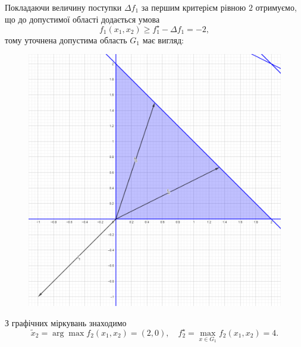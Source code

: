 \begin{solution}
    Покладаючи величину поступки $\Delta f_1$ за першим критерієм рівною $2$ отримуємо, що до допустимої області додається умова \[ f_1(x_1, x_2) \ge f_1^\star - \Delta f_1 = -2, \] тому уточнена допустима область $G_1$ має вигляд:
    \begin{figure}[H]
        \centering
        \includegraphics[width=\textwidth]{successive_concessions_1_2.png}
    \end{figure}

    З графічних міркувань знаходимо \[ \tilde x_2 = \arg \max f_2(x_1, x_2) = (2, 0), \quad f_2^\star = \max_{x \in G_1} f_2(x_1, x_2) = 4. \]
    

\end{solution}
